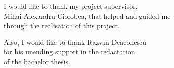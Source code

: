 \vspace*{7cm}
\begin{center}
I would like to thank my project supervisor,\\
Mihai Alexandru Ciorobea, that helped and guided me\\
through the realisation of this project.\\
\end{center}
\vspace{0.6cm}
\begin{center}
Also, I would like to thank Razvan Deaconescu\\
for his unending support in the redactation\\
of the bachelor thesis.\\
\end{center}